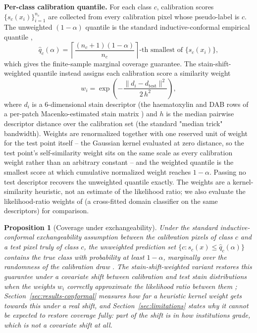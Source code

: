 \documentclass[conference]{IEEEtran}
\newtheorem{proposition}{Proposition}
\begin{document}
\textbf{Per-class calibration quantile.} For each class $c$, calibration
scores $\{s_c(x_i)\}_{i=1}^{n_c}$ are collected from every calibration pixel
whose pseudo-label is $c$. The unweighted $(1-\alpha)$ quantile is the
standard inductive-conformal empirical quantile \cite{vovk2005},
\begin{equation}
\hat q_c(\alpha) = \left\lceil \frac{(n_c+1)(1-\alpha)}{n_c} \right\rceil\text{-th smallest of } \{s_c(x_i)\},
\end{equation}
which gives the finite-sample marginal coverage guarantee. The
stain-shift-weighted quantile \cite{tibshirani2019} instead assigns each
calibration score a similarity weight
\begin{equation}
w_i = \exp\!\left(-\frac{\lVert d_i - d_{\text{test}} \rVert^2}{2\,h^2}\right),
\end{equation}
where $d_i$ is a 6-dimensional stain descriptor (the haematoxylin and DAB
rows of a per-patch Macenko-estimated stain matrix \cite{macenko2009}) and
$h$ is the median pairwise descriptor distance over the calibration set
(the standard "median trick" bandwidth). Weights are renormalized together
with one reserved unit of weight for the test point itself -- the Gaussian
kernel evaluated at zero distance, so the test point's self-similarity
weight sits on the same scale as every calibration weight rather than an
arbitrary constant -- and the weighted quantile is the smallest score at
which cumulative normalized weight reaches $1-\alpha$. Passing no test
descriptor recovers the unweighted quantile exactly. The weights are a
kernel-similarity heuristic, not an estimate of the likelihood ratio; we also
evaluate the likelihood-ratio weights of \cite{tibshirani2019} (a cross-fitted
domain classifier on the same descriptors) for comparison.

\begin{proposition}[Coverage under exchangeability]
\label{prop:coverage}
Under the standard inductive-conformal exchangeability assumption between
the calibration pixels of class $c$ and a test pixel truly of class $c$,
the unweighted prediction set $\{c : s_c(x) \le \hat q_c(\alpha)\}$
contains the true class with probability at least $1-\alpha$, marginally
over the randomness of the calibration draw \cite{vovk2005}. The
stain-shift-weighted variant restores this guarantee under a covariate
shift between calibration and test stain distributions when the weights
$w_i$ correctly approximate the likelihood ratio between them
\cite{tibshirani2019}; Section~\ref{sec:results-conformal} measures how far a
heuristic kernel weight gets towards this under a real shift, and
Section~\ref{sec:limitations} states why it cannot be expected to restore
coverage fully: part of the shift is in how institutions grade, which is not a
covariate shift at all.
\end{proposition}
\end{document}
